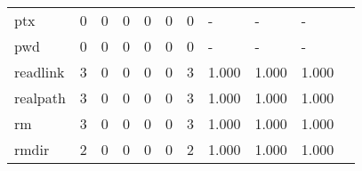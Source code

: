 \begin{longtable}{lp{1.20cm}p{1.20cm}p{1.20cm}p{1.20cm}p{1.20cm}p{1.20cm}p{1.20cm}p{1.20cm}p{1.20cm}p{1.20cm}}
ptx       &                                     0 &                                                  0 &                                                  0 &                                                  0 &                                                  0 &                                                  0 &                                             - &                                                  - &                                                  - \\
pwd       &                                     0 &                                                  0 &                                                  0 &                                                  0 &                                                  0 &                                                  0 &                                             - &                                                  - &                                                  - \\
readlink  &                                     3 &                                                  0 &                                                  0 &                                                  0 &                                                  0 &                                                  3 &                                         1.000 &                                              1.000 &                                              1.000 \\
realpath  &                                     3 &                                                  0 &                                                  0 &                                                  0 &                                                  0 &                                                  3 &                                         1.000 &                                              1.000 &                                              1.000 \\
rm        &                                     3 &                                                  0 &                                                  0 &                                                  0 &                                                  0 &                                                  3 &                                         1.000 &                                              1.000 &                                              1.000 \\
rmdir     &                                     2 &                                                  0 &                                                  0 &                                                  0 &                                                  0 &                                                  2 &                                         1.000 &                                              1.000 &                                              1.000 \\

\end{longtable}
